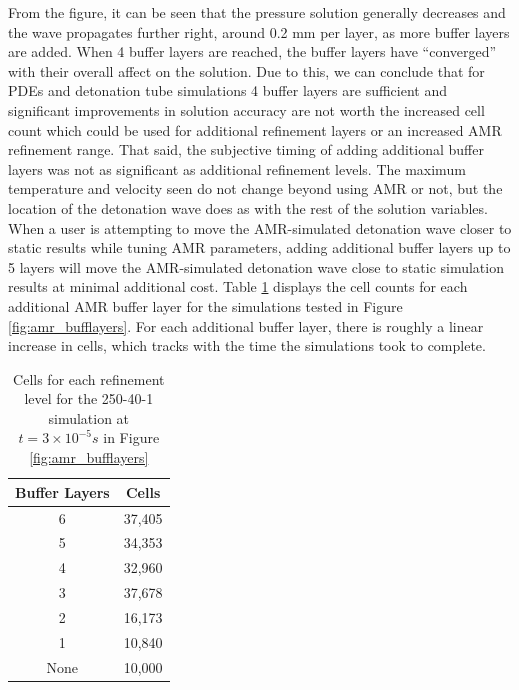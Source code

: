 \noindent From the figure, it can be seen that the pressure solution generally decreases and the wave propagates further right, around 0.2 mm per layer, as more buffer layers are added. When 4 buffer layers are reached, the buffer layers have ``converged'' with their overall affect on the solution. Due to this, we can conclude that for PDEs and detonation tube simulations 4 buffer layers are sufficient and significant improvements in solution accuracy are not worth the increased cell count which could be used for additional refinement layers or an increased AMR refinement range. That said, the subjective timing of adding additional buffer layers was not as significant as additional refinement levels. The maximum temperature and velocity seen do not change beyond using AMR or not, but the location of the detonation wave does as with the rest of the solution variables. When a user is attempting to move the AMR-simulated detonation wave closer to static results while tuning AMR parameters, adding additional buffer layers up to 5 layers will move the AMR-simulated detonation wave close to static simulation results at minimal additional cost. Table \ref{tab:amr_bufflayers} displays the cell counts for each additional AMR buffer layer for the simulations tested in Figure \ref{fig:amr_bufflayers}. For each additional buffer layer, there is roughly a linear increase in cells, which tracks with the time the simulations took to complete. 

\begin{table}[h]
\centering
\caption{Cells for each refinement level for the 250-40-1 simulation at \(t = 3\times 10^{ - 5} s\) in Figure \ref{fig:amr_bufflayers}}
\label{tab:amr_bufflayers}
\begin{tabular}{cc}
Buffer Layers & Cells \\ \hline
6 & 37,405 \\ 
5 & 34,353 \\
4 & 32,960 \\
3 & 37,678 \\
2 & 16,173 \\
1 & 10,840 \\
None & 10,000 \\
\end{tabular}
\end{table}


